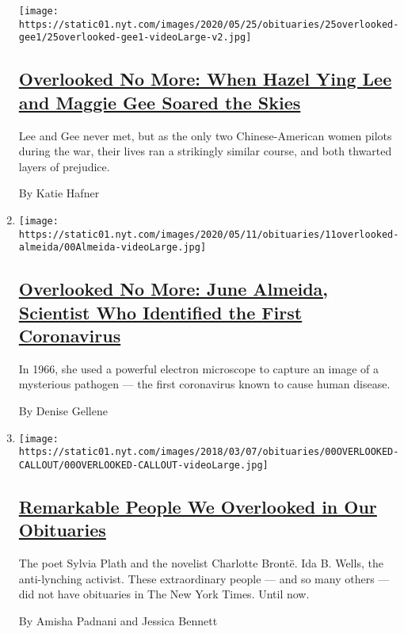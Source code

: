 \begin{enumerate}
  \texttt{[image: https://static01.nyt.com/images/2020/05/25/obituaries/25overlooked-gee1/25overlooked-gee1-videoLarge-v2.jpg]}

  \hypertarget{overlooked-no-more-when-hazel-ying-lee-and-maggie-gee-soared-the-skies}{%
  \subsection{\texorpdfstring{\href{/2020/05/21/obituaries/hazel-ying-lee-and-maggie-gee-overlooked.html}{Overlooked
  No More: When Hazel Ying Lee and Maggie Gee Soared the
  Skies}}{Overlooked No More: When Hazel Ying Lee and Maggie Gee Soared the Skies}}\label{overlooked-no-more-when-hazel-ying-lee-and-maggie-gee-soared-the-skies}}

  Lee and Gee never met, but as the only two Chinese-American women
  pilots during the war, their lives ran a strikingly similar course,
  and both thwarted layers of prejudice.

  By Katie Hafner
\item
  \texttt{[image: https://static01.nyt.com/images/2020/05/11/obituaries/11overlooked-almeida/00Almeida-videoLarge.jpg]}

  \hypertarget{overlooked-no-more-june-almeida-scientist-who-identified-the-first-coronavirus}{%
  \subsection{\texorpdfstring{\href{/2020/05/08/obituaries/june-almeida-overlooked-coronavirus.html}{Overlooked
  No More: June Almeida, Scientist Who Identified the First
  Coronavirus}}{Overlooked No More: June Almeida, Scientist Who Identified the First Coronavirus}}\label{overlooked-no-more-june-almeida-scientist-who-identified-the-first-coronavirus}}

  In 1966, she used a powerful electron microscope to capture an image
  of a mysterious pathogen --- the first coronavirus known to cause
  human disease.

  By Denise Gellene
\item
  \texttt{[image: https://static01.nyt.com/images/2018/03/07/obituaries/00OVERLOOKED-CALLOUT/00OVERLOOKED-CALLOUT-videoLarge.jpg]}

  \hypertarget{remarkable-people-we-overlooked-in-our-obituaries}{%
  \subsection{\texorpdfstring{\href{/interactive/2018/obituaries/overlooked.html}{Remarkable
  People We Overlooked in Our
  Obituaries}}{Remarkable People We Overlooked in Our Obituaries}}\label{remarkable-people-we-overlooked-in-our-obituaries}}

  The poet Sylvia Plath and the novelist Charlotte Brontë. Ida B. Wells,
  the anti-lynching activist. These extraordinary people --- and so many
  others --- did not have obituaries in The New York Times. Until now.

  By Amisha Padnani and Jessica Bennett
\end{enumerate}

